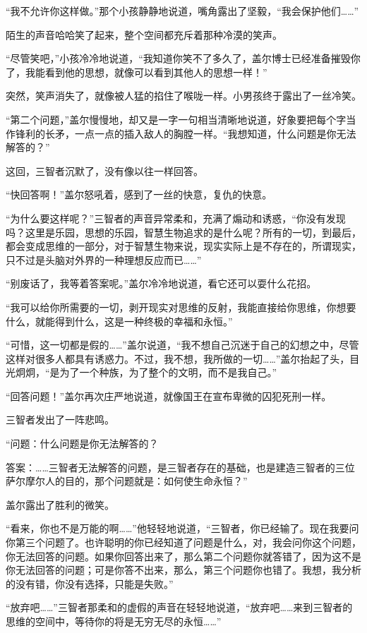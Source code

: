 “我不允许你这样做。”那个小孩静静地说道，嘴角露出了坚毅，“我会保护他们……” 

陌生的声音哈哈笑了起来，整个空间都充斥着那种冷漠的笑声。 

“尽管笑吧，”小孩冷冷地说道，“我知道你笑不了多久了，盖尔博士已经准备摧毁你了，我能看到他的思想，就像可以看到其他人的思想一样！” 

突然，笑声消失了，就像被人猛的掐住了喉咙一样。小男孩终于露出了一丝冷笑。 

“第二个问题，”盖尔慢慢地，却又是一字一句相当清晰地说道，好象要把每个字当作锋利的长矛，一点一点的插入敌人的胸膛一样。“我想知道，什么问题是你无法解答的？” 

这回，三智者沉默了，没有像以往一样回答。 

“快回答啊！”盖尔怒吼着，感到了一丝的快意，复仇的快意。 

“为什么要这样呢？”三智者的声音异常柔和，充满了煽动和诱惑，“你没有发现吗？这里是乐园，思想的乐园，智慧生物追求的是什么呢？所有的一切，到最后，都会变成思维的一部分，对于智慧生物来说，现实实际上是不存在的，所谓现实，只不过是头脑对外界的一种理想反应而已……” 

“别废话了，我等着答案呢。”盖尔冷冷地说道，看它还可以耍什么花招。 

“我可以给你所需要的一切，剥开现实对思维的反射，我能直接给你思维，你想要什么，就能得到什么，这是一种终极的幸福和永恒。” 

“可惜，这一切都是假的……”盖尔说道，“我不想自己沉迷于自己的幻想之中，尽管这样对很多人都具有诱惑力。不过，我不想，我所做的一切……”盖尔抬起了头，目光炯炯，“是为了一个种族，为了整个的文明，而不是我自己。” 

“回答问题！”盖尔再次庄严地说道，就像国王在宣布卑微的囚犯死刑一样。 

三智者发出了一阵悲鸣。 

“问题：什么问题是你无法解答的？ 

答案：……三智者无法解答的问题，是三智者存在的基础，也是建造三智者的三位萨尔摩尔人的目的，那个问题就是：如何使生命永恒？” 

盖尔露出了胜利的微笑。 

“看来，你也不是万能的啊……”他轻轻地说道，“三智者，你已经输了。现在我要问你第三个问题了。也许聪明的你已经知道了问题是什么，对，我会问你这个问题，你无法回答的问题。如果你回答出来了，那么第二个问题你就答错了，因为这不是你无法回答的问题；可是你答不出来，那么，第三个问题你也错了。我想，我分析的没有错，你没有选择，只能是失败。” 

“放弃吧……”三智者那柔和的虚假的声音在轻轻地说道，“放弃吧……来到三智者的思维的空间中，等待你的将是无穷无尽的永恒……” 

